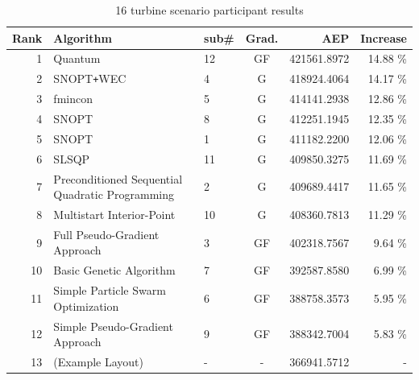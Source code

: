 \documentclass[conf,hidelinks]{new-aiaa} %
\begin{document}


\begin{table}[h!]
    \begin{center}
        \caption{16 turbine scenario participant results}
        \label{tab:results1}
        \begin{tabular}{r l l c r r}
            \hline
            Rank	& Algorithm											& sub\#	& Grad.	& AEP			& Increase		\\	%
            \hline
            1       & Quantum								            & 12    & GF	& 421561.8972	&	14.88 \% 	\\ %
            2       & SNOPT\texttt{+}WEC								& 4     & G		& 418924.4064	&	14.17 \% 	\\ %
            3       & fmincon											& 5     & G		& 414141.2938	&	12.86 \% 	\\ %
            4       & SNOPT												& 8     & G		& 412251.1945	&	12.35 \% 	\\ %
			5       & SNOPT												& 1     & G		& 411182.2200	&	12.06 \% 	\\ %
			6		& SLSQP												& 11	& G		& 409850.3275	&	11.69 \% 	\\ %
            7       & Preconditioned Sequential Quadratic Programming	& 2     & G		& 409689.4417	&	11.65 \% 	\\ %
            8       & Multistart Interior-Point							& 10    & G		& 408360.7813	&	11.29 \% 	\\ %
			9       & Full Pseudo-Gradient Approach						& 3     & GF	& 402318.7567	&	9.64 \% 	\\ %
            10      & Basic Genetic Algorithm							& 7     & GF	& 392587.8580	&	6.99 \% 	\\ %
            11      & Simple Particle Swarm Optimization				& 6     & GF	& 388758.3573	&	5.95 \% 	\\ %
            12      & Simple Pseudo-Gradient Approach					& 9     & GF	& 388342.7004	&	5.83 \% 	\\ %
            13		& (Example Layout)									& -		& -		& 366941.5712	&	- 			\\ %
            \hline
        \end{tabular}
    \end{center}


\end{table}
\end{document}
